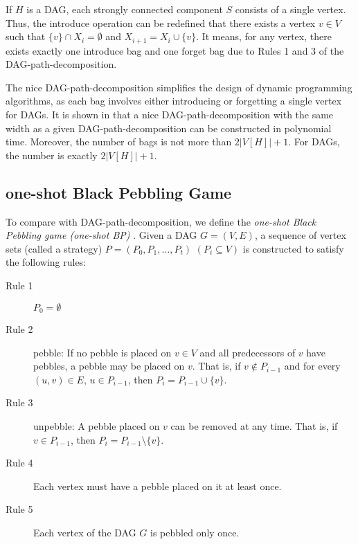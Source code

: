 \documentclass[runningheads]{llncs}
\theoremstyle{plain}
\theoremstyle{definition}
\begin{document}
If $H$ is a DAG, each strongly connected component $S$ consists of a single vertex. Thus, the introduce operation can be redefined that there exists a vertex $v \in V$ such that $\{v\} \cap X_i = \emptyset$ and $X_{i+1} = X_i \cup \{v\}$. It means, for any vertex, there exists exactly one introduce bag and one forget bag due to Rules 1 and 3 of the DAG-path-decomposition.

The nice DAG-path-decomposition simplifies the design of dynamic programming algorithms, as each bag involves either introducing or forgetting a single vertex for DAGs. It is shown in \cite{art12} that a nice DAG-path-decomposition with the same width as a given DAG-path-decomposition can be constructed in polynomial time. Moreover, the number of bags is not more than $2|V[H]| + 1$. For DAGs, the number is exactly $2|V[H]| + 1$.



\subsection{one-shot Black Pebbling Game} %
To compare with DAG-path-decomposition, we define the \emph{one-shot Black Pebbling game (one-shot BP)} \cite{art13}. Given a DAG $G = (V, E)$, a sequence of vertex sets (called a strategy) $P = (P_0, P_1, \dots, P_t)$ $(P_i \subseteq V)$ is constructed to satisfy the following rules:

\begin{description}
    \item[Rule 1] $P_0 = \emptyset$
    \item[Rule 2] pebble: If no pebble is placed on $v \in V$ and all predecessors of $v$ have pebbles, a pebble may be placed on $v$. That is, if $v \notin P_{i-1}$ and for every $(u, v) \in E$, $u \in P_{i-1}$, then $P_i = P_{i-1} \cup \{v\}$.
    \item[Rule 3] unpebble: A pebble placed on $v$ can be removed at any time. That is, if $v \in P_{i-1}$, then $P_i = P_{i-1} \setminus \{v\}$.
    \item[Rule 4] Each vertex must have a pebble placed on it at least once.
    \item[Rule 5] Each vertex of the DAG $G$ is pebbled only once.
\end{description}
\end{document}

